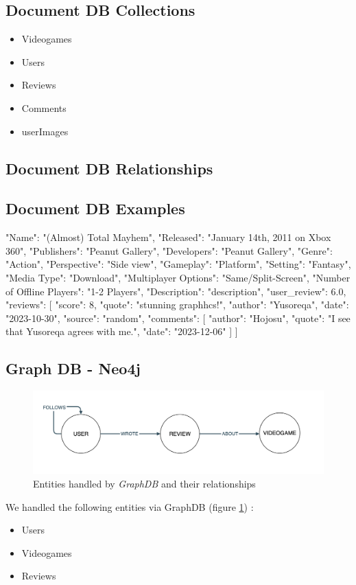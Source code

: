 \subsection{Document DB Collections}
\begin{itemize}
	\item Videogames 
	\item Users
	\item Reviews 
	\item Comments 
	\item userImages 
\end{itemize}
\subsection{Document DB Relationships}
\subsection{Document DB Examples}
\begin{python}
    {
	"Name": "(Almost) Total Mayhem",
	"Released": "January 14th, 2011 on Xbox 360",
	"Publishers": "Peanut Gallery",
	"Developers": "Peanut Gallery",
	"Genre": "Action",
	"Perspective": "Side view",
	"Gameplay": "Platform",
	"Setting": "Fantasy",
	"Media Type": "Download",
	"Multiplayer Options": "Same/Split-Screen",
	"Number of Offline Players": "1-2 Players",
	"Description": "description",
	"user_review": 6.0,
	"reviews": [
	{
		"score": 8,
		"quote": "stunning graphhcs!",
		"author": "Yusoreqa",
		"date": "2023-10-30",
		"source": "random",
		"comments": [
		{
			"author": "Hojosu",
			"quote": "I see that Yusoreqa agrees with me.",
			"date": "2023-12-06"
		}
		]
	}
	]
}
\end{python}
\subsection{Graph DB - Neo4j}
\begin{figure}[t]
	\centering
	\includegraphics[width=1\textwidth]{chapter3/img/graph.png}
	\caption{Entities handled by \emph{GraphDB} and their relationships}
	\label{fig:graph}
\end{figure}
We handled the following entities via GraphDB (figure \ref{fig:graph}) :
\begin{itemize}
	\item Users 
	\item Videogames 
	\item Reviews
\end{itemize}
